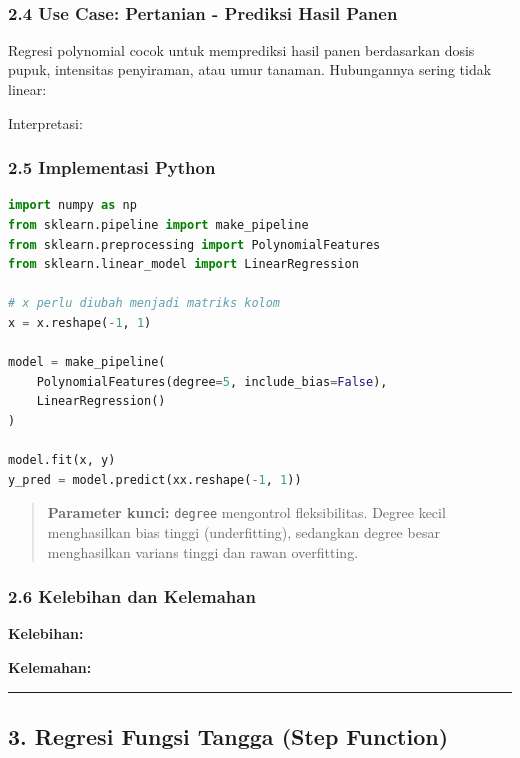 \documentclass[12pt,a4paper]{article}
\begin{document}
\\[
\hat{\beta} = (X_{\text{poly}}^T X_{\text{poly}})^{-1} X_{\text{poly}}^T y
\\]


\subsubsection{2.4 Use Case: Pertanian - Prediksi Hasil Panen}

Regresi polynomial cocok untuk memprediksi hasil panen berdasarkan dosis pupuk, intensitas penyiraman, atau umur tanaman. Hubungannya sering tidak linear:



Interpretasi:


\subsubsection{2.5 Implementasi Python}

\begin{lstlisting}[language=Python]
import numpy as np
from sklearn.pipeline import make_pipeline
from sklearn.preprocessing import PolynomialFeatures
from sklearn.linear_model import LinearRegression

# x perlu diubah menjadi matriks kolom
x = x.reshape(-1, 1)

model = make_pipeline(
    PolynomialFeatures(degree=5, include_bias=False),
    LinearRegression()
)

model.fit(x, y)
y_pred = model.predict(xx.reshape(-1, 1))
\end{lstlisting}

\begin{quote}
\textbf{Parameter kunci:} \texttt{degree} mengontrol fleksibilitas. Degree kecil menghasilkan bias tinggi (underfitting), sedangkan degree besar menghasilkan varians tinggi dan rawan overfitting.\end{quote}


\subsubsection{2.6 Kelebihan dan Kelemahan}

\textbf{Kelebihan:}


\textbf{Kelemahan:}


\hrule


\subsection{3. Regresi Fungsi Tangga (Step Function)}
\end{document}
